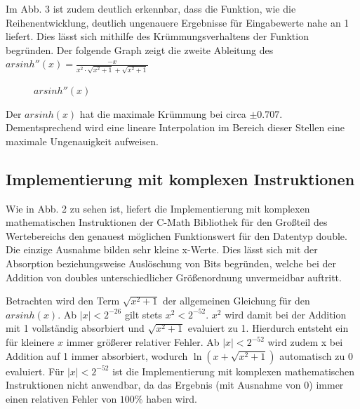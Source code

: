 \documentclass[course=erap] {aspdoc}
\begin{document}
{    Im Abb. 3 ist zudem deutlich erkennbar, dass die Funktion, wie die Reihenentwicklung, deutlich ungenauere Ergebnisse für Eingabewerte nahe an 1 liefert.
    Dies lässt sich mithilfe des Krümmungsverhaltens der Funktion begründen.
    Der folgende Graph zeigt die zweite Ableitung des $arsinh''(x) = \frac{-x}{x^2\cdot \sqrt{x^2+1}+\sqrt{x^2+1}}$
    \begin{figure}
        \caption{$arsinh''(x)$}
    \end{figure}


    Der $arsinh(x)$ hat die maximale Krümmung bei circa $\pm 0.707$.
    Dementsprechend wird eine lineare Interpolation im Bereich dieser Stellen eine maximale Ungenauigkeit aufweisen.

    \subsection{Implementierung mit komplexen Instruktionen}\label{subsec:implementierung-mit-komplexen-instruktionen}

    Wie in Abb. 2 zu sehen ist, liefert die Implementierung mit komplexen mathematischen Instruktionen der C-Math Bibliothek für den Großteil des Wertebereichs den genauest möglichen Funktionswert für den Datentyp double.
    Die einzige Ausnahme bilden sehr kleine x-Werte.
    Dies lässt sich mit der Absorption beziehungsweise Auslöschung von Bits begründen, welche bei der Addition von doubles unterschiedlicher Größenordnung unvermeidbar auftritt.

    Betrachten wird den Term $\sqrt{x^2 + 1}$ der allgemeinen Gleichung für den $arsinh(x)$.
    Ab $|x|<2^{-26}$ gilt stets $x^2<2^{-52}$. $x^2$ wird damit bei der Addition mit 1 vollständig absorbiert und $\sqrt{x^2 + 1}$ evaluiert zu 1.
    Hierdurch entsteht ein für kleinere $x$ immer größerer relativer Fehler.
    Ab $|x|<2^{-52}$ wird zudem x bei Addition auf 1 immer absorbiert, wodurch $\ln{(x+\sqrt{x^2 + 1})}$ automatisch zu 0 evaluiert.
    Für $|x|<2^{-52}$ ist die Implementierung mit komplexen mathematischen Instruktionen nicht anwendbar, da das Ergebnis (mit Ausnahme von 0) immer einen relativen Fehler von $100\%$ haben wird.


}
\end{document}
